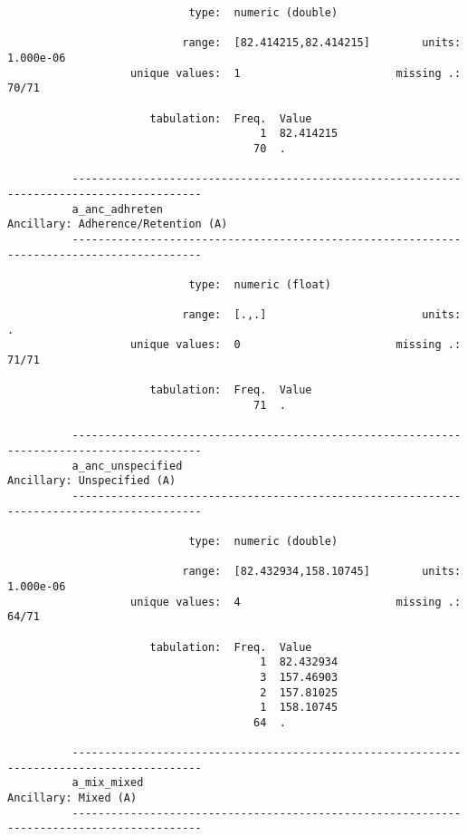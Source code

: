 \documentclass{article}
\begin{document}
\begin{verbatim}
                            type:  numeric (double)
          
                           range:  [82.414215,82.414215]        units:  1.000e-06
                   unique values:  1                        missing .:  70/71
          
                      tabulation:  Freq.  Value
                                       1  82.414215
                                      70  .
          
          ------------------------------------------------------------------------------------------
          a_anc_adhreten                                          Ancillary: Adherence/Retention (A)
          ------------------------------------------------------------------------------------------
          
                            type:  numeric (float)
          
                           range:  [.,.]                        units:  .
                   unique values:  0                        missing .:  71/71
          
                      tabulation:  Freq.  Value
                                      71  .
          
          ------------------------------------------------------------------------------------------
          a_anc_unspecified                                               Ancillary: Unspecified (A)
          ------------------------------------------------------------------------------------------
          
                            type:  numeric (double)
          
                           range:  [82.432934,158.10745]        units:  1.000e-06
                   unique values:  4                        missing .:  64/71
          
                      tabulation:  Freq.  Value
                                       1  82.432934
                                       3  157.46903
                                       2  157.81025
                                       1  158.10745
                                      64  .
          
          ------------------------------------------------------------------------------------------
          a_mix_mixed                                                           Ancillary: Mixed (A)
          ------------------------------------------------------------------------------------------
          

\end{verbatim}
\end{document}
